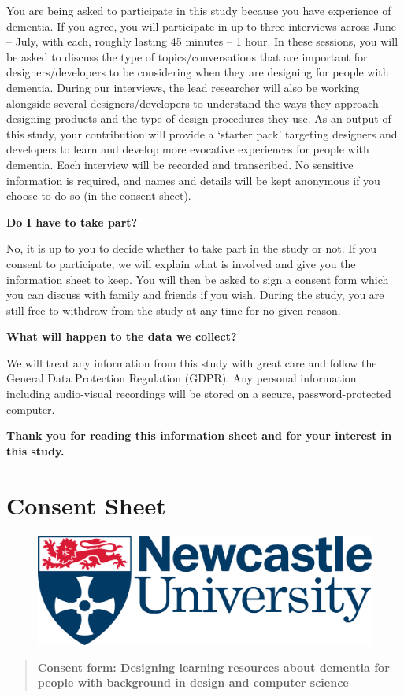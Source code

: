 You are being asked to participate in this study because you have experience of dementia. If you agree, you will participate in up to three interviews across June – July, with each, roughly lasting 45 minutes – 1 hour.  In these sessions, you will be asked to discuss the type of topics/conversations that are important for designers/developers to be considering when they are designing for people with dementia. During our interviews, the lead researcher will also be working alongside several designers/developers to understand the ways they approach designing products and the type of design procedures they use. As an output of this study, your contribution will provide a ‘starter pack’ targeting designers and developers to learn and develop more evocative experiences for people with dementia. Each interview will be recorded and transcribed. No sensitive information is required, and names and details will be kept anonymous if you choose to do so (in the consent sheet). 

\textbf{Do I have to take part?}

No, it is up to you to decide whether to take part in the study or not. If you consent to participate, we will explain what is involved and give you the information sheet to keep. You will then be asked to sign a consent form which you can discuss with family and friends if you wish. During the study, you are still free to withdraw from the study at any time for no given reason.

\textbf{What will happen to the data we collect?}

We will treat any information from this study with great care and follow the General Data Protection Regulation (GDPR). Any personal information including audio-visual recordings will be stored on a secure, password-protected computer.

\textbf{Thank you for reading this information sheet and for your interest in this study.
}

\newpage

\section{Consent Sheet}
\label{app:ConSheets}
\begin{figure}[htp]
    \centering
    \includegraphics[width=0.3\linewidth]{Images/logo.png}
\end{figure}
\begin{quote}
\textbf{Consent form: Designing learning resources about dementia for people with background
in design and computer science}
\end{quote}

